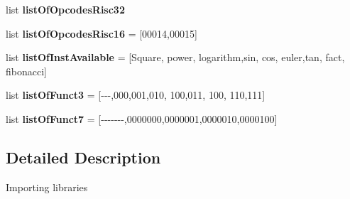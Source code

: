\begin{DoxyCompactItemize}
\item 
list {\bfseries list\+Of\+Opcodes\+Risc32}
\item 
list {\bfseries list\+Of\+Opcodes\+Risc16} = \mbox{[}\textquotesingle{}00014\textquotesingle{},\textquotesingle{}00015\textquotesingle{}\mbox{]}\hypertarget{namespaceselectInst_a6b120c146a028ea6bc01189bbbab3352}{}\label{namespaceselectInst_a6b120c146a028ea6bc01189bbbab3352}

\item 
list {\bfseries list\+Of\+Inst\+Available} = \mbox{[}\textquotesingle{}Square\textquotesingle{}, \textquotesingle{}power\textquotesingle{}, \textquotesingle{}logarithm\textquotesingle{},\textquotesingle{}sin\textquotesingle{}, \textquotesingle{}cos\textquotesingle{}, \textquotesingle{}euler\textquotesingle{},\textquotesingle{}tan\textquotesingle{}, \textquotesingle{}fact\textquotesingle{}, \textquotesingle{}fibonacci\textquotesingle{}\mbox{]}\hypertarget{namespaceselectInst_a8af9693e64b74d7f96e76883fc332274}{}\label{namespaceselectInst_a8af9693e64b74d7f96e76883fc332274}

\item 
list {\bfseries list\+Of\+Funct3} = \mbox{[}\textquotesingle{}-\/-\/-\/\textquotesingle{},\textquotesingle{}000\textquotesingle{},\textquotesingle{}001\textquotesingle{},\textquotesingle{}010\textquotesingle{}, \textquotesingle{}100\textquotesingle{},\textquotesingle{}011\textquotesingle{}, \textquotesingle{}100\textquotesingle{}, \textquotesingle{}110\textquotesingle{},\textquotesingle{}111\textquotesingle{}\mbox{]}\hypertarget{namespaceselectInst_a4cb4f9fa288d18f4616fe0f0b79411b2}{}\label{namespaceselectInst_a4cb4f9fa288d18f4616fe0f0b79411b2}

\item 
list {\bfseries list\+Of\+Funct7} = \mbox{[}\textquotesingle{}-\/-\/-\/-\/-\/-\/-\/\textquotesingle{},\textquotesingle{}0000000\textquotesingle{},\textquotesingle{}0000001\textquotesingle{},\textquotesingle{}0000010\textquotesingle{},\textquotesingle{}0000100\textquotesingle{}\mbox{]}\hypertarget{namespaceselectInst_ac7bb1b194b41ded2d2160b9d9dd385f4}{}\label{namespaceselectInst_ac7bb1b194b41ded2d2160b9d9dd385f4}

\end{DoxyCompactItemize}


\subsection{Detailed Description}
\begin{DoxyVerb}Importing libraries
\end{DoxyVerb}
 

